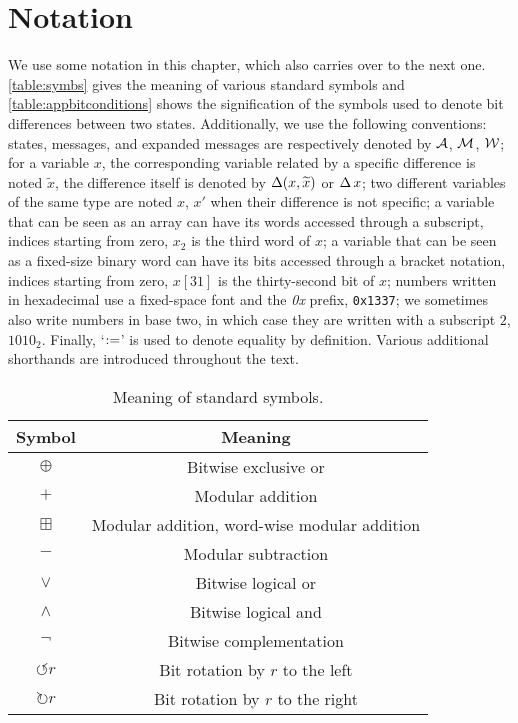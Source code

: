 \section{Notation}
\label{sec:not}

We use some notation in this chapter, which also carries over to the next one.
\autoref{table:symbs} gives the meaning of various standard symbols and \autoref{table:appbitconditions} shows the signification of the symbols used to denote bit differences between two states.
Additionally, we use the following conventions: \shaone states, messages, and expanded messages are respectively denoted by $\mathcal{A}$, $\mathcal{M}$, $\mathcal{W}$; for a variable $x$, the corresponding variable related by a specific
difference is noted $\widetilde{x}$, the difference itself is denoted by $\operatorname{\Delta}(x,\widetilde{x})$ or $\operatorname{\Delta} x$; two different variables of the same type are noted $x$, $x'$ when their difference is not specific;
a variable that can be seen as an array can have its words accessed through a subscript, indices starting from zero, \eg $x_2$ is the third word of $x$; a variable that can be seen as a fixed-size binary word
can have its bits accessed through a bracket notation, indices starting from zero, \eg $x[31]$ is the thirty-second bit of $x$; 
numbers written in hexadecimal use a fixed-space font and the \emph{0x} prefix, \eg \texttt{0x1337}; we sometimes also write numbers in base two, in which case they are written with a subscript $2$, \eg $1010_2$. Finally, `$:=$' is used to denote equality by definition.
Various additional shorthands are introduced throughout the text.

\begin{table}[!htb]
\caption{Meaning of standard symbols.}\label{table:symbs}
\begin{center}
\begin{tabular}{c c}
\toprule
Symbol & Meaning\\
\midrule
$\oplus$ & Bitwise exclusive or\\
$+$ & Modular addition\\
$\boxplus$ & Modular addition, word-wise modular addition\\
$-$ & Modular subtraction\\
$\vee$ & Bitwise logical or\\
$\wedge$ & Bitwise logical and\\
$\neg$ & Bitwise complementation\\
$\circlearrowleft r$ & Bit rotation by $r$ to the left\\
$\circlearrowright r$ & Bit rotation by $r$ to the right\\
\bottomrule
\end{tabular}
\end{center}
\end{table}

